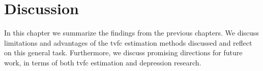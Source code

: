 \chapter{Discussion}\label{ch:discussion}

In this chapter we summarize the findings from the previous chapters.
We discuss limitations and advantages of the \gls{tvfc} estimation methods discussed and reflect on this general task.
Furthermore, we discuss promising directions for future work, in terms of both \gls{tvfc} estimation and depression research.
